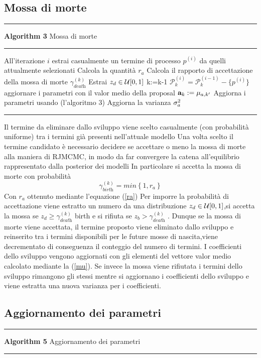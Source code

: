 \subsection{Mossa di morte}
\hrule 
\textbf{Algorithm 3} Mossa di morte
\hrule

\begin{algorithmic}
\State All'iterazione $i$ estrai casualmente un termine di processo $p^{(i)}$ da quelli attualmente  selezionati
\State Calcola la quantità $r_a$
\State Calcola il rapporto di accettazione della mossa di morte $\gamma_{\textit{death}}^{(k)}$
\State Estrai $z_d\in\mathcal{U}[0,1]$
\State k:=k-1
\State $ \mathcal{P}_k^{(i)}= \mathcal{P}_k^{(i-1)}- \{p^{(i)}\} $
\State aggiornare i parametri con il valor medio della proposal $\textbf{a}_k:=\mu_{a,k'}$
\Else
\State Aggiorna i parametri usando (l'algoritmo 3)
\State Aggiorna la varianza $\sigma_a^2$
\EndIf
\end{algorithmic}
\hrule
\vspace{2em}
Il termine da eliminare dallo sviluppo viene scelto casualmente (con probabilità
uniforme) tra i termini già presenti nell’attuale modello
Una volta scelto il termine candidato è necessario decidere se accettare o meno la
mossa di morte alla maniera di RJMCMC, in modo da far convergere la catena
all’equilibrio rappresentato dalla posterior dei modelli
In particolare si accetta la mossa di morte con probabilità
\begin{equation}
\gamma_{\textit{birth}}^{(k)}=min\left\lbrace 1,r_a\right\rbrace
\end{equation}
Con $r_a$ ottenuto mediante l’equazione (\ref{ra})
Per imporre la probabilità di accettazione viene estratto un numero da una distribuzione
 $z_d\in\mathcal{U}[0,1]$,si accetta la
mossa se $z_d\geq \gamma_{\textit{death}}^{(k)}$ birth e si rifiuta se $z_b> \gamma_{\textit{death}}^{(k)}$ .
Dunque se la mossa di morte viene accettata, il termine proposto viene eliminato
dallo sviluppo e reinserito tra i termini disponibili per le future mosse di nascita,viene
decrementato di conseguenza il conteggio del numero di termini. I coefficienti dello
sviluppo vengono aggiornati con gli elementi del vettore valor medio calcolato mediante la (\ref{mu}).
Se invece la mossa viene rifiutata i termini dello sviluppo rimangono gli stessi mentre
si aggiornano i coefficienti dello sviluppo e viene estratta una nuova varianza per i
coefficienti.
\subsection{Aggiornamento dei parametri}
\hrule 
\textbf{Algorithm 5} Aggiornamento dei parametri
\hrule

